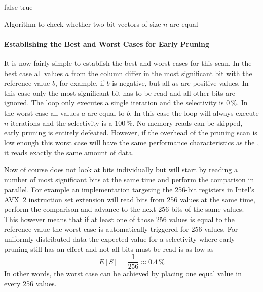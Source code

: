\begin{algorithm}[h]
\begin{algorithmic}[1]
        \State \Return false
      \EndIf
    \EndFor
    \State \Return true
  \EndProcedure
\end{algorithmic}
\caption{Algorithm to check whether two bit vectors of size $n$ are equal}
\label{algo:equal}
\end{algorithm}

\paragraph{Establishing the Best and Worst Cases for Early Pruning}

It is now fairly simple to establish the best and worst cases for this scan. In
the best case all values $a$ from the column differ in the most significant bit
with the reference value $b$, for example, if $b$ is negative, but all $a$s are
positive values. In this case only the most significant bit has to be read and
all other bits are ignored. The loop only executes a single iteration and the
selectivity is $0\,\%$. In the worst case all values $a$ are equal to $b$. In
this case the loop will always execute $n$ iterations and the selectivity is a
$100\,\%$. No memory reads can be skipped, early pruning is entirely defeated.
However, if the overhead of the pruning scan is low enough this worst case will
have the same performance characteristics as the \simdscan{}, it reads exactly
the same amount of data.


Now of course \bwv{} does not look at bits individually but will start by
reading a number of most significant bits at the same time and perform the
comparison in parallel. For example an implementation targeting the 256-bit
registers in Intel's AVX~2 instruction set extension will read bits from 256
values at the same time, perform the comparison and advance to the next 256 bits
of the same values. This however means that if at least one of those 256 values
is equal to the reference value the worst case is automatically triggered for
256 values. For uniformly distributed data the expected value for a selectivity
where early pruning still has an effect and not all bits must be read is as low
as $$E[S]=\frac{1}{256}\approx 0.4\,\%$$ In other words, the worst case can be
achieved by placing one equal value in every 256 values.

